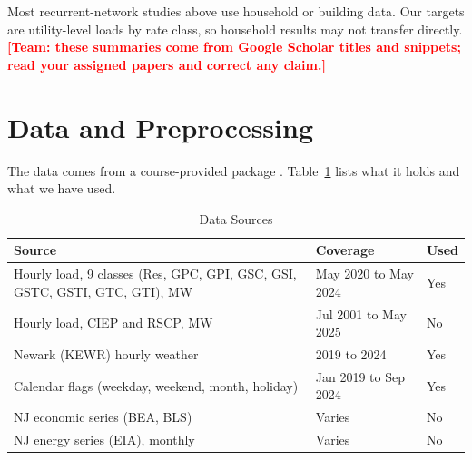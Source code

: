 \documentclass[conference]{IEEEtran}
\newcommand{\todo}[1]{\textcolor{red}{\textbf{[Team: #1]}}}
\begin{document}
Most recurrent-network studies above use household or building data. Our targets are utility-level loads by rate class, so household results may not transfer directly. \todo{these summaries come from Google Scholar titles and snippets; read your assigned papers and correct any claim.}

\section{Data and Preprocessing}
The data comes from a course-provided package \cite{course}. Table~\ref{tab:data} lists what it holds and what we have used.

\begin{table}[t]
\caption{Data Sources}
\label{tab:data}
\centering\footnotesize
\setlength{\tabcolsep}{3pt}
\begin{tabular}{@{}p{1.55in}p{1.0in}p{0.55in}@{}}
\toprule
Source & Coverage & Used \\
\midrule
Hourly load, 9 classes (Res, GPC, GPI, GSC, GSI, GSTC, GSTI, GTC, GTI), MW & May 2020 to May 2024 & Yes \\
Hourly load, CIEP and RSCP, MW & Jul 2001 to May 2025 & No \\
Newark (KEWR) hourly weather & 2019 to 2024 & Yes \\
Calendar flags (weekday, weekend, month, holiday) & Jan 2019 to Sep 2024 & Yes \\
NJ economic series (BEA, BLS) & Varies & No \\
NJ energy series (EIA), monthly & Varies & No \\
\bottomrule
\end{tabular}
\end{table}
\end{document}
